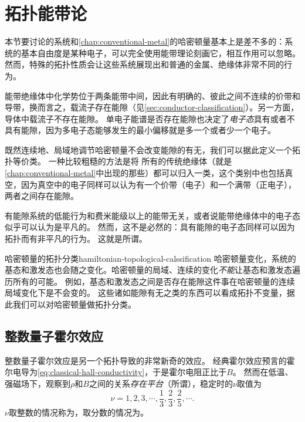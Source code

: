 \chapter{拓扑能带论}

本节要讨论的系统和\autoref{chap:conventional-metal}的哈密顿量基本上是差不多的：系统的基本自由度是某种电子，可以完全使用能带理论刻画它，相互作用可以忽略。
然而，特殊的拓扑性质会让这些系统展现出和普通的金属、绝缘体非常不同的行为。

能带绝缘体中化学势位于两条能带中间，因此有明确的、彼此之间不连续的价带和导带，换而言之，载流子存在能隙（见\autoref{sec:conductor-classification}）。另一方面，导体中载流子不存在能隙。
单电子能谱是否存在能隙也决定了\emph{电子态}具有或者不具有能隙，因为多电子态能够发生的最小偏移就是多一个或者少一个电子。

既然连续地、局域地调节哈密顿量不会改变能隙的有无，我们可以据此定义一个拓扑等价类。
一种比较粗糙的方法是将
所有的传统绝缘体（就是\autoref{chap:conventional-metal}中出现的那些）都可以归入一类，这个类别中也包括真空，因为真空中的电子同样可以认为有一个价带（电子）和一个满带（正电子），两者之间存在能隙。

有能隙系统的低能行为和费米能级以上的能带无关，或者说能带绝缘体中的电子态似乎可以认为是平凡的。
然而，这不是必然的：具有能隙的电子态同样可以因为拓扑而有非平凡的行为。
这就是所谓。

\begin{back}{哈密顿量的拓扑分类}{hamiltonian-topological-calssification}
    哈密顿量变化，系统的基态和激发态也会随之变化。哈密顿量的局域、连续的变化\emph{不能}让基态和激发态遍历所有的可能。
    例如，基态和激发态之间是否存在能隙这件事在哈密顿量的连续局域变化下是不会变的。
    这些诸如能隙有无之类的东西可以看成拓扑不变量，据此我们可以对哈密顿量做拓扑分类。
\end{back}

\section{整数量子霍尔效应}

整数量子霍尔效应是另一个拓扑导致的非常新奇的效应。
经典霍尔效应预言的霍尔电导为\eqref{eq:classical-hall-conductivity}，于是霍尔电阻正比于$B$。
然而在低温、强磁场下，观察到$\rho$和$B$之间的关系\emph{存在平台}（所谓），稳定时的$\nu$取值为
\[
    \nu = 1, 2, 3, \cdots, \frac{1}{3}, \frac{2}{3}, \frac{2}{5}, \cdots.
\]
$\nu$取整数的情况称为，取分数的情况为。

